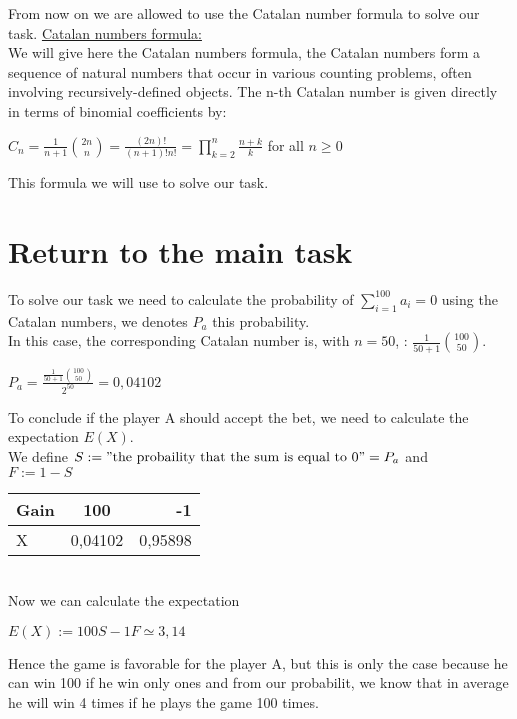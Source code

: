 \documentclass[a4paper,12pt,oneside]{article}
\begin{document}
\vspace{0.3cm}
From now on we are allowed to use the Catalan number formula to solve our task.
\newpage 
\underline{Catalan numbers formula:}
\vspace{0.3cm}\\
We will give here the Catalan numbers formula, the Catalan numbers form a sequence of natural numbers that occur in various counting problems, often involving recursively-defined objects. The n-th Catalan number is given directly in terms of binomial coefficients by:
\begin{center}
$C_{n}=\frac{1}{n+1}\binom{2n}{n}=\frac{(2n)!}{(n+1)!n!}=\prod_{k=2}^n\frac{n+k}{k}$\hspace{0.4cm} \textrm{for all} $n\geq0$
\end{center}
\vspace{0.3cm}
This formula we will use to solve our task.
\newpage
\section{Return to the main task}
\vspace{0.3cm}
To solve our task we need to calculate the probability of  $\sum^{100}_{i=1}a_{i}=0$ using the Catalan numbers, we denotes $P_{a}$ this probability.
\\In this case, the corresponding Catalan number is, with $n=50$, : $\frac{1}{50+1}\binom{100}{50}$.
\begin{center}
$P_{a}=\frac{\frac{1}{50+1}\binom{100}{50}}{2^{50}}=0,04102$
\end{center} 
To conclude if the player A should accept the bet, we need to calculate the expectation $E(X)$. 
\\We define $S:="\textrm{the probaility that the sum is equal to 0}"=P_{a}$ and \\ $F:=1-S$  
\begin{table}[h]
\centering
\begin{tabular}{|  l | c | r | }
\hline
Gain & 100 & -1\\ \hline
X & 0,04102 & 0,95898\\ \hline
\end{tabular}
\end{table}
\\Now we can calculate the expectation
\begin{center}
 $E(X):=100S-1F\simeq3,14$
\end{center}
Hence the game is favorable for the player A, but this is only the case because he can win 100 if he win only ones and from our probabilit, we know that in average he will win 4 times if he plays the game 100 times.
\end{document}
